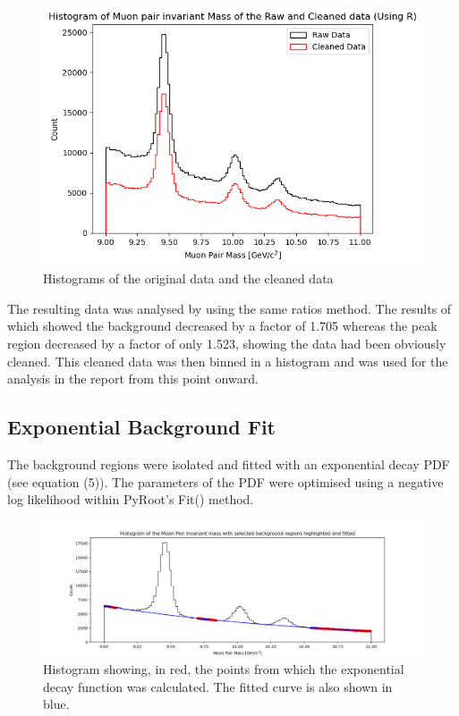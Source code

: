 \begin{figure}[H]
\centering
\includegraphics[width=0.6\columnwidth]{figures/cleaned_hist.png}
\caption{Histograms of the original data and the cleaned data}
\label{fig:2d_hists_ex}
\end{figure}

The resulting data was analysed by using the same ratios method. The results of which showed the background decreased by a factor of 1.705 whereas the peak region decreased by a factor of only 1.523, showing the data had been obviously cleaned. This cleaned data was then binned in a histogram and was used for the analysis in the report from this point onward.

\subsection*{Exponential Background Fit}

The background regions were isolated and fitted with an exponential decay PDF (see equation (5)). The parameters of the PDF were
optimised using a negative log likelihood within PyRoot’s Fit() method.


\begin{figure}[H]
\centering
\includegraphics[width=0.9\columnwidth]{figures/expo_high_hist.png}
\caption{Histogram showing, in red, the points from which the exponential decay function was calculated. The fitted curve is also shown in blue.}
\label{fig:2d_hists_ex}
\end{figure}



